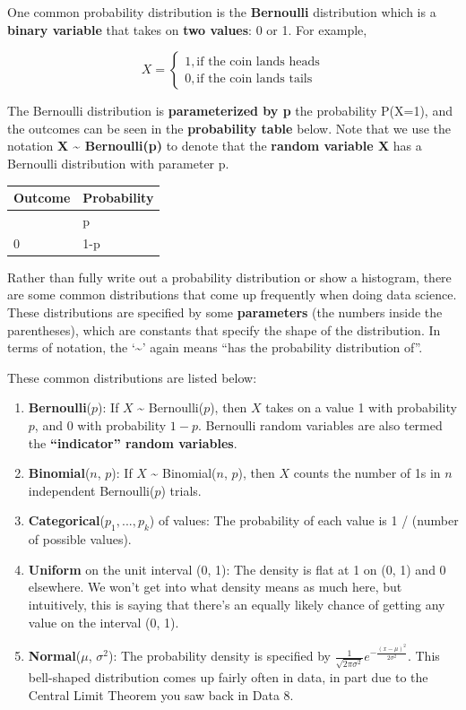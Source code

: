 \documentclass[
  letterpaper,
  DIV=11,
  numbers=noendperiod]{scrreprt}
\providecommand{\tightlist}{%
  \setlength{\itemsep}{0pt}\setlength{\parskip}{0pt}}\usepackage{longtable,booktabs,array}
\begin{document}
One common probability distribution is the \textbf{Bernoulli}
distribution which is a \textbf{binary variable} that takes on
\textbf{two values}: 0 or 1. For example,

\[X = \begin{cases} 
      1, \text{if the coin lands heads} \\
      0, \text{if the coin lands tails} 
   \end{cases}\]

The Bernoulli distribution is \textbf{parameterized by p} the
probability P(X=1), and the outcomes can be seen in the
\textbf{probability table} below. Note that we use the notation
\textbf{X \textasciitilde{} Bernoulli(p)} to denote that the
\textbf{random variable X} has a Bernoulli distribution with parameter
p.

\begin{longtable}[]{@{}ll@{}}
\toprule\noalign{}
Outcome & Probability \\
\midrule\noalign{}
\endhead
\bottomrule\noalign{}
\endlastfoot
1 & p \\
0 & 1-p \\
\end{longtable}

Rather than fully write out a probability distribution or show a
histogram, there are some common distributions that come up frequently
when doing data science. These distributions are specified by some
\textbf{parameters} (the numbers inside the parentheses), which are
constants that specify the shape of the distribution. In terms of
notation, the `\textasciitilde{}' again means ``has the probability
distribution of''.

These common distributions are listed below:

\begin{enumerate}
\def\labelenumi{\arabic{enumi}.}
\tightlist
\item
  \textbf{Bernoulli}(\(p\)): If \(X\) \textasciitilde{}
  Bernoulli(\(p\)), then \(X\) takes on a value 1 with probability
  \(p\), and 0 with probability \(1 - p\). Bernoulli random variables
  are also termed the \textbf{``indicator'' random variables}.
\item
  \textbf{Binomial}(\(n\), \(p\)): If \(X\) \textasciitilde{}
  Binomial(\(n\), \(p\)), then \(X\) counts the number of 1s in \(n\)
  independent Bernoulli(\(p\)) trials.
\item
  \textbf{Categorical}(\(p_1, ..., p_k\)) of values: The probability of
  each value is 1 / (number of possible values).
\item
  \textbf{Uniform} on the unit interval (0, 1): The density is flat at 1
  on (0, 1) and 0 elsewhere. We won't get into what density means as
  much here, but intuitively, this is saying that there's an equally
  likely chance of getting any value on the interval (0, 1).
\item
  \textbf{Normal}(\(\mu\), \(\sigma^2\)): The probability density is
  specified by
  \(\frac{1}{\sqrt{2\pi\sigma^2}}e^{-\frac{(x-\mu)^2}{2\sigma^2}}\).
  This bell-shaped distribution comes up fairly often in data, in part
  due to the Central Limit Theorem you saw back in Data 8.
\end{enumerate}
\end{document}
